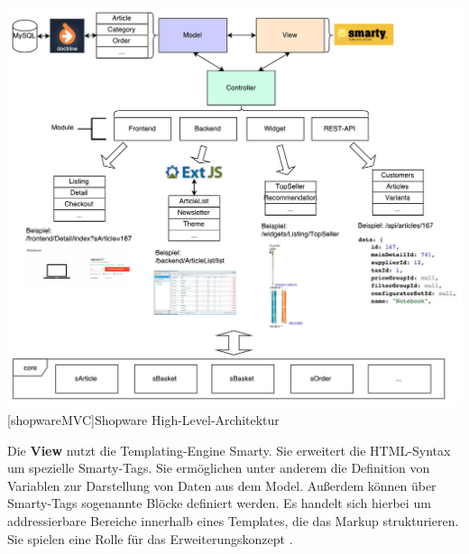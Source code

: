 \documentclass[11pt, a4paper, titlepage, listof=totoc, bibliography=totoc, index=totoc, twoside, openright, headings=normal]{scrreprt}
\begin{document}
\vspace{1em}
\begin{minipage}{\linewidth}
	\centering
	\includegraphics[width=1\linewidth]{Abbildungen/shopwareMVC.pdf}
	[shopwareMVC]{Shopware High-Level-Architektur}
	\label{fig:shopwareMVC}
\end{minipage}
\vspace{1em}

Die \textbf{View} nutzt die Templating-Engine Smarty. Sie erweitert die HTML-Syntax um spezielle Smarty-Tags. Sie ermöglichen unter anderem die Definition von Variablen zur Darstellung von Daten aus dem Model. Außerdem können über Smarty-Tags sogenannte Blöcke definiert werden. Es handelt sich hierbei um addressierbare Bereiche innerhalb eines Templates, die das Markup strukturieren. Sie spielen eine Rolle für das Erweiterungskonzept \citep{shopware5Docs}.
\end{document}
